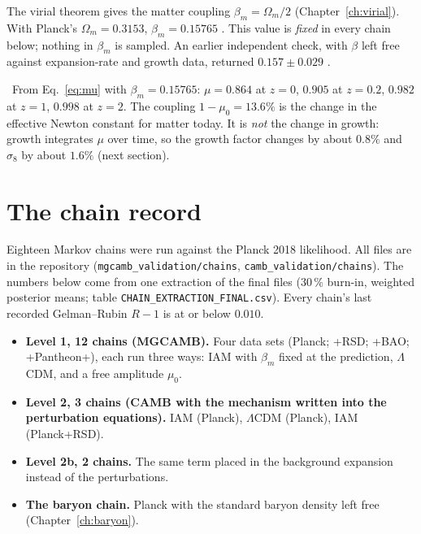 \begin{keybox}[title={The coupling is predicted, not fitted}]
The virial theorem gives the matter coupling $\beta_m=\Omega_m/2$ (Chapter~\ref{ch:virial}). With Planck's $\Omega_m=0.3153$,
$\beta_m=0.15765$ \derived. This value is \emph{fixed} in every chain below; nothing in $\beta_m$ is sampled.
An earlier independent check, with $\beta$ left free against expansion-rate and growth data, returned $0.157\pm0.029$ \observed.
\end{keybox}

\begin{checkbox}
\calc\ From Eq.~\eqref{eq:mu} with $\beta_m=0.15765$: $\mu=0.864$ at $z=0$, $0.905$ at $z=0.2$, $0.982$ at $z=1$, $0.998$ at $z=2$.
The coupling $1-\mu_0=13.6\%$ is the change in the effective Newton constant for matter today. It is \emph{not} the change in growth:
growth integrates $\mu$ over time, so the growth factor changes by about $0.8\%$ and $\sigma_8$ by about $1.6\%$ (next section).
\end{checkbox}

\section{The chain record}\label{sec:chains}

Eighteen Markov chains were run against the Planck 2018 likelihood. All files are in the repository
(\texttt{mgcamb\_validation/chains}, \texttt{camb\_validation/chains}). The numbers below come from one extraction of the final files
(30\,\% burn-in, weighted posterior means; table \texttt{CHAIN\_EXTRACTION\_FINAL.csv}). Every chain's last recorded Gelman--Rubin
$R-1$ is at or below $0.010$.

\begin{itemize}
 \item \textbf{Level 1, 12 chains (MGCAMB).} Four data sets (Planck; +RSD; +BAO; +Pantheon+), each run three ways: IAM with
       $\beta_m$ fixed at the prediction, $\Lambda$CDM, and a free amplitude $\mu_0$.
 \item \textbf{Level 2, 3 chains (CAMB with the mechanism written into the perturbation equations).} IAM (Planck), $\Lambda$CDM (Planck), IAM (Planck+RSD).
 \item \textbf{Level 2b, 2 chains.} The same term placed in the background expansion instead of the perturbations.
 \item \textbf{The baryon chain.} Planck with the standard baryon density left free (Chapter~\ref{ch:baryon}).
\end{itemize}


